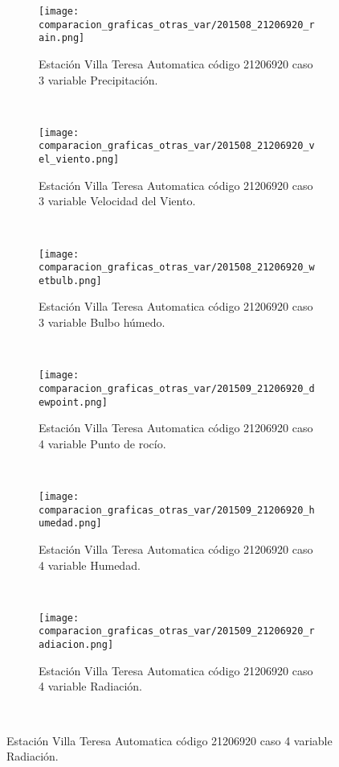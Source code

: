 \begin{figure}[H]
\centering
\begin{subfigure}[normla]{0.4\textwidth}
\caption{Estación Villa Teresa Automatica código 21206920 caso 3 variable Precipitación.}
\texttt{[image: comparacion\_graficas\_otras\_var/201508\_21206920\_rain.png]}
\end{subfigure}
~
\begin{subfigure}[normla]{0.4\textwidth}
\caption{Estación Villa Teresa Automatica código 21206920 caso 3 variable Velocidad del Viento.}
\texttt{[image: comparacion\_graficas\_otras\_var/201508\_21206920\_vel\_viento.png]}
\end{subfigure}
~
\begin{subfigure}[normla]{0.4\textwidth}
\caption{Estación Villa Teresa Automatica código 21206920 caso 3 variable Bulbo húmedo.}
\texttt{[image: comparacion\_graficas\_otras\_var/201508\_21206920\_wetbulb.png]}
\end{subfigure}
~
\begin{subfigure}[normla]{0.4\textwidth}
\caption{Estación Villa Teresa Automatica código 21206920 caso 4 variable Punto de rocío.}
\texttt{[image: comparacion\_graficas\_otras\_var/201509\_21206920\_dewpoint.png]}
\end{subfigure}
~
\begin{subfigure}[normla]{0.4\textwidth}
\caption{Estación Villa Teresa Automatica código 21206920 caso 4 variable Humedad.}
\texttt{[image: comparacion\_graficas\_otras\_var/201509\_21206920\_humedad.png]}
\end{subfigure}
~
\begin{subfigure}[normla]{0.4\textwidth}
\caption{Estación Villa Teresa Automatica código 21206920 caso 4 variable Radiación.}
\texttt{[image: comparacion\_graficas\_otras\_var/201509\_21206920\_radiacion.png]}
\end{subfigure}
~
\end{figure}
           
